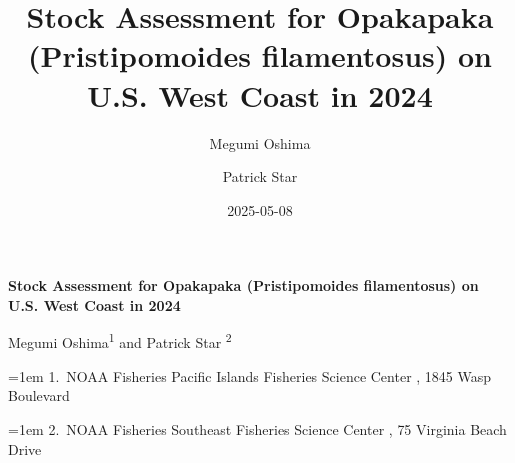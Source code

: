 \documentclass[
]{scrartcl}
\title{Stock Assessment for Opakapaka (Pristipomoides filamentosus) on
U.S. West Coast in 2024}
\author{Megumi Oshima \and Patrick Star}
\date{2025-05-08}
\begin{document}
  \begin{titlepage}

  \begin{minipage}[b][\textheight][s]{\textwidth}


  \raggedright




  {\huge\bfseries\nohyphens{Stock Assessment for Opakapaka
  (Pristipomoides filamentosus) on U.S. West Coast in
  2024}}\\[1\baselineskip]



  \vspace{1\baselineskip}


  \vspace{1\baselineskip}

   {\large{Megumi Oshima}}{\textsuperscript{1}}%
  { and \large{Patrick Star}}%
  {\textsuperscript{2}}%



  \vspace{2\baselineskip}

  \hangindent=1em
  {1}.~{NOAA Fisheries Pacific Islands Fisheries Science Center}%
  , %
  {1845 Wasp Boulevard}%
  \par\hangindent=1em%
  {2}.~{NOAA Fisheries Southeast Fisheries Science Center}%
  , %
  {75 Virginia Beach Drive}%



\end{minipage}
\end{titlepage}
\end{document}
